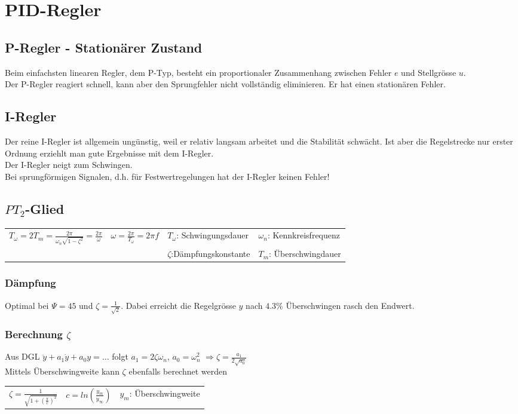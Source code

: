 \section{PID-Regler }

	\subsection{P-Regler - Stationärer Zustand }
		Beim einfachsten linearen Regler, dem P-Typ, besteht ein proportionaler
		Zusammenhang zwischen Fehler $e$ und Stellgrösse $u$.\\
		Der P-Regler reagiert schnell, kann aber den Sprungfehler nicht vollständig
		eliminieren. Er hat einen stationären Fehler.


	\subsection{I-Regler }
		Der reine I-Regler ist allgemein ungünstig, weil er relativ langsam arbeitet
		und die Stabilität schwächt. Ist aber die Regelstrecke nur erster Ordnung
		erziehlt man gute Ergebnisse mit dem I-Regler.\\
		Der I-Regler neigt zum Schwingen.\\
		Bei sprungförmigen Signalen, d.h. für Festwertregelungen hat der I-Regler
		keinen Fehler!


	\subsection{$PT_2$-Glied }
		\begin{tabular}{p{5cm}p{3cm}p{4cm}p{4cm}}
			$T_\omega = 2T_m=\frac{2\pi}{\omega_n \sqrt{1-\zeta^2}}=\frac{2\pi}{\omega}$ & $\omega = \frac{2\pi}{T_\omega}=2\pi f$ &  $T_\omega$: Schwingungsdauer & $\omega_n$: Kennkreisfrequenz\\
			& & $\zeta$:Dämpfungskonstante & $T_m$: Überschwingdauer
		\end{tabular}

		\subsubsection{Dämpfung}
		Optimal bei $\Psi=45$ und $\zeta=\frac{1}{\sqrt{2}}$.
		Dabei erreicht die Regelgrösse $y$ nach $4.3\%$ Überschwingen rasch den	Endwert.
		\subsubsection{Berechnung $\zeta$}
		Aus DGL $\ddot{y}+a_1\dot{y}+a_0 y=\ldots$ folgt $a_1=2\zeta\omega_n$, $a_0=\omega_n^2$ $\Rightarrow \zeta=\frac{a_1}{2\sqrt{a_0}}$ \\
		Mittels Überschwingweite kann $\zeta$ ebenfalls berechnet werden\\
		\begin{tabular}{p{3cm}p{3cm}p{6cm}}
			$\zeta = \frac{1}{\sqrt{1+(\frac{\pi}{c})^2}}$ & $c =ln(\frac{y_m}{y_{\infty}})$ & $y_m$: Überschwingweite
		\end{tabular}

